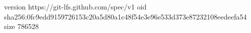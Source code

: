 version https://git-lfs.github.com/spec/v1
oid sha256:0fc9edd9159726153c20a5d80a1c48f54e3e96e533d373e87232108eedeefa54
size 786528
